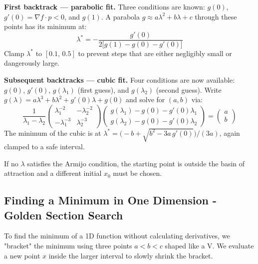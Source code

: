 \documentclass[12pt, a4paper]{article}
\begin{document}
\begin{tcolorbox}[colback=blue!5!white,colframe=blue!75!black,title=Backtracking: Parabolic and Cubic Polynomial Fitting]
\textbf{First backtrack --- parabolic fit.} Three conditions are known: $g(0)$, $g'(0) = \nabla f \cdot p < 0$, and $g(1)$. A parabola $g \approx a\lambda^2 + b\lambda + c$ through these points has its minimum at:
\begin{equation}
\lambda^* = -\frac{g'(0)}{2\bigl[g(1) - g(0) - g'(0)\bigr]}
\end{equation}
Clamp $\lambda^*$ to $[0.1,\, 0.5]$ to prevent steps that are either negligibly small or dangerously large.

\textbf{Subsequent backtracks --- cubic fit.} Four conditions are now available: $g(0)$, $g'(0)$, $g(\lambda_1)$ (first guess), and $g(\lambda_2)$ (second guess). Write $g(\lambda) = a\lambda^3 + b\lambda^2 + g'(0)\lambda + g(0)$ and solve for $(a,b)$ via:
\begin{equation}
\frac{1}{\lambda_1 - \lambda_2}
\begin{pmatrix} \lambda_1^{-2} & -\lambda_2^{-2} \\ -\lambda_1^{-3} & \lambda_2^{-3} \end{pmatrix}
\begin{pmatrix} g(\lambda_1) - g(0) - g'(0)\lambda_1 \\ g(\lambda_2) - g(0) - g'(0)\lambda_2 \end{pmatrix}
= \begin{pmatrix} a \\ b \end{pmatrix}
\end{equation}
The minimum of the cubic is at $\lambda^* = \bigl(-b + \sqrt{b^2 - 3a\,g'(0)}\bigr)/(3a)$, again clamped to a safe interval.

If no $\lambda$ satisfies the Armijo condition, the starting point is outside the basin of attraction and a different initial $x_0$ must be chosen.
\end{tcolorbox}

\subsection{Finding a Minimum in One Dimension - Golden Section Search}
\label{subsec:1dmin}
To find the minimum of a 1D function without calculating derivatives, we "bracket" the minimum using three points $a < b < c$ shaped like a V. We evaluate a new point $x$ inside the larger interval to slowly shrink the bracket.
\end{document}
